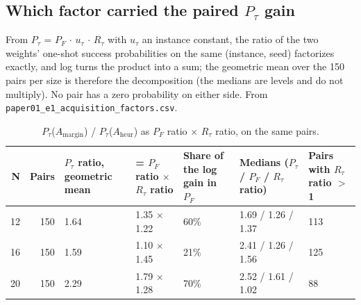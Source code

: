 \documentclass[journal]{IEEEtran}
\begin{document}
\subsection{Which factor carried the paired $P_{\tau}$ gain}


From $P_{\tau}$ = $P_{F}$ $\cdot$ $u_{\tau}$ $\cdot$ $R_{\tau}$ with $u_{\tau}$ an instance constant, the ratio of the two weights' one-shot success probabilities on the same (instance, seed) factorizes exactly, and log turns the product into a sum; the geometric mean over the 150 pairs per size is therefore the decomposition (the medians are levels and do not multiply). No pair has a zero probability on either side. From \texttt{paper01\_e1\_acquisition\_factors.csv}.


\begin{table}[!t]
\centering
\scriptsize
\caption{$P_{\tau}$($A_{\mathrm{margin}}$) / $P_{\tau}$($A_{\mathrm{heur}}$) as $P_{F}$ ratio $\times$ $R_{\tau}$ ratio, on the same pairs.}
\label{tab:S38}
\begin{tabular}{rrp{}p{}p{}p{}p{}}
\toprule
N & Pairs & $P_{\tau}$ ratio, geometric mean & = $P_{F}$ ratio $\times$ $R_{\tau}$ ratio & Share of the log gain in $P_{F}$ & Medians ($P_{\tau}$ / $P_{F}$ / $R_{\tau}$ ratio) & Pairs with $R_{\tau}$ ratio $>$ 1 \\
\midrule
12 & 150 & 1.64 & 1.35 $\times$ 1.22 & 60\% & 1.69 / 1.26 / 1.37 & 113 \\
16 & 150 & 1.59 & 1.10 $\times$ 1.45 & 21\% & 2.41 / 1.26 / 1.56 & 125 \\
20 & 150 & 2.29 & 1.79 $\times$ 1.28 & 70\% & 2.52 / 1.61 / 1.02 & 88 \\
\bottomrule
\end{tabular}
\end{table}
\end{document}
